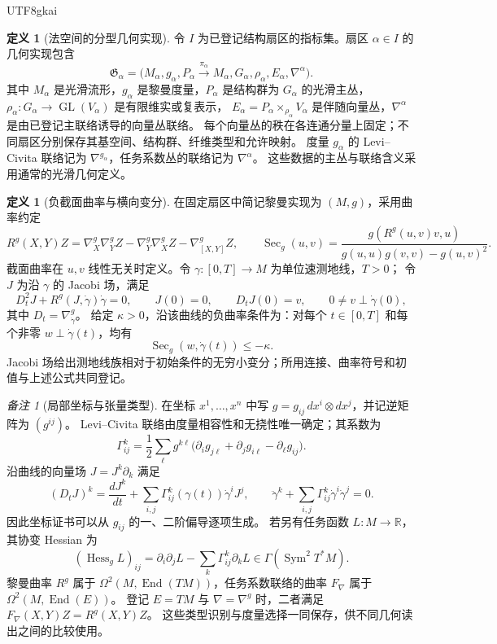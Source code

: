 \documentclass[12pt,a4paper,openany,notitlepage]{report}
\theoremstyle{plain}
\theoremstyle{definition}
\newtheorem{definition}[theorem]{定义}
\theoremstyle{remark}
\newtheorem{remark}[theorem]{备注}
\begin{document}
\begin{CJK*}{UTF8}{gkai}
\begin{definition}[法空间的分型几何实现]
\label{hgov:geo:def:sector}
令 $I$ 为已登记结构扇区的指标集。扇区 $\alpha\in I$ 的几何实现包含
\[
\mathfrak G_\alpha=
\bigl(M_\alpha,g_\alpha,
P_\alpha\xrightarrow{\pi_\alpha}M_\alpha,
G_\alpha,\rho_\alpha,E_\alpha,\nabla^\alpha\bigr).
\]
其中 $M_\alpha$ 是光滑流形，$g_\alpha$ 是黎曼度量，$P_\alpha$ 是结构群为 $G_\alpha$ 的光滑主丛，
$\rho_\alpha:G_\alpha\to\operatorname{GL}(V_\alpha)$ 是有限维实或复表示，
$E_\alpha=P_\alpha\times_{\rho_\alpha}V_\alpha$ 是伴随向量丛，$\nabla^\alpha$ 是由已登记主联络诱导的向量丛联络。
每个向量丛的秩在各连通分量上固定；不同扇区分别保存其基空间、结构群、纤维类型和允许映射。
度量 $g_\alpha$ 的 Levi--Civita 联络记为 $\nabla^{g_\alpha}$，任务系数丛的联络记为 $\nabla^\alpha$。
这些数据的主丛与联络含义采用通常的光滑几何定义\cite{ExtKobayashiNomizu}。
\end{definition}

\begin{definition}[负截面曲率与横向变分]
\label{hgov:geo:def:jacobi}
在固定扇区中简记黎曼实现为 $(M,g)$，采用曲率约定
\[
R^g(X,Y)Z=
\nabla^g_X\nabla^g_YZ-
\nabla^g_Y\nabla^g_XZ-
\nabla^g_{[X,Y]}Z,
\qquad
\operatorname{Sec}_g(u,v)=
\frac{g(R^g(u,v)v,u)}{
g(u,u)g(v,v)-g(u,v)^2}.
\]
截面曲率在 $u,v$ 线性无关时定义。令 $\gamma:[0,T]\to M$ 为单位速测地线，$T>0$；
令 $J$ 为沿 $\gamma$ 的 Jacobi 场，满足
\begin{equation}
\label{hgov:geo:eq:jacobi}
D_t^2J+R^g(J,\dot\gamma)\dot\gamma=0,
\qquad J(0)=0,\qquad D_tJ(0)=v,
\qquad 0\ne v\perp\dot\gamma(0),
\end{equation}
其中 $D_t=\nabla^g_{\dot\gamma}$。
给定 $\kappa>0$，沿该曲线的负曲率条件为：对每个 $t\in[0,T]$ 和每个非零
$w\perp\dot\gamma(t)$，均有
\[
\operatorname{Sec}_g(w,\dot\gamma(t))\le-\kappa.
\]
Jacobi 场给出测地线族相对于初始条件的无穷小变分；所用连接、曲率符号和初值与上述公式共同登记\cite{ExtLeeRiemann}。
\end{definition}

\begin{remark}[局部坐标与张量类型]
在坐标 $x^1,\ldots,x^n$ 中写 $g=g_{ij}\,dx^i\otimes dx^j$，并记逆矩阵为 $(g^{ij})$。
Levi--Civita 联络由度量相容性和无挠性唯一确定；其系数为
\[
\Gamma^k_{ij}=\frac12\sum_\ell g^{k\ell}
\bigl(\partial_i g_{j\ell}+\partial_jg_{i\ell}-\partial_\ell g_{ij}\bigr).
\]
沿曲线的向量场 $J=J^k\partial_k$ 满足
\[
(D_tJ)^k=\frac{dJ^k}{dt}
+\sum_{i,j}\Gamma^k_{ij}(\gamma(t))\dot\gamma^iJ^j,
\qquad
\ddot\gamma^k+\sum_{i,j}\Gamma^k_{ij}\dot\gamma^i\dot\gamma^j=0.
\]
因此坐标证书可以从 $g_{ij}$ 的一、二阶偏导逐项生成。
若另有任务函数 $L:M\to\mathbb R$，其协变 Hessian 为
\[
(\operatorname{Hess}_gL)_{ij}
=\partial_i\partial_jL-\sum_k\Gamma^k_{ij}\partial_kL
\in\Gamma(\operatorname{Sym}^2T^*M).
\]
黎曼曲率 $R^g$ 属于 $\Omega^2(M,\operatorname{End}(TM))$，任务系数联络的曲率
$F_\nabla$ 属于 $\Omega^2(M,\operatorname{End}(E))$。
登记 $E=TM$ 与 $\nabla=\nabla^g$ 时，二者满足
$F_\nabla(X,Y)Z=R^g(X,Y)Z$。
这些类型识别与度量选择一同保存，供不同几何读出之间的比较使用。
\end{remark}


\end{CJK*}
\end{document}
